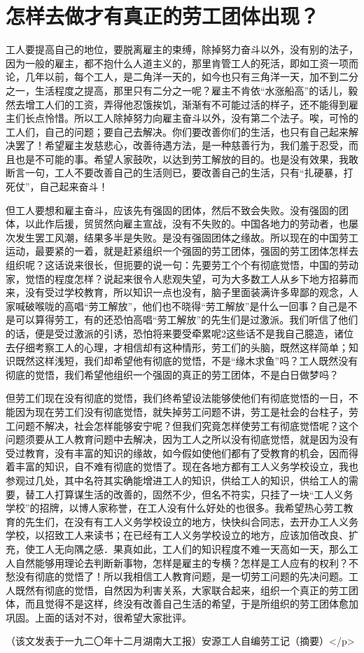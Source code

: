 \section{怎样去做才有真正的劳工团体出现？ }


工人要提高自己的地位，要脱离雇主的束缚，除掉努力奋斗以外，没有别的法子，因为一般的雇主，都不抱什么人道主义的，那里肯管工人的死活，即如工资一项而论，几年以前，每个工人，是二角洋一天的，如今也只有三角洋一天，加不到二分之一，生活程度之提高，那里只有二分之一呢？雇主不肯依“水涨船高”的话儿，毅然去增工人们的工资，弄得他忍饿挨饥，渐渐有不可能过活的样子，还不能得到雇主们长点怜惜。所以工人除掉努力向雇主奋斗以外，没有第二个法子。唉，可怜的工人们，自己的问题；要自己去解决。你们要改善你们的生活，也只有自己起来解决罢了！希望雇主发慈悲心，改善待遇方法，是一种慈善行为，我们羞于忍受，而且也是不可能的事。希望人家鼓吹，以达到劳工解放的目的。也是没有效果，我敢断言一句，工人不要改善自己的生活则已，要改善自己的生活，只有“扎硬暴，打死仗”，自己起来奋斗！

但工人要想和雇主奋斗，应该先有强固的团体，然后不致会失败。没有强固的团体，以此作后援，贸贸然向雇主宣战，没有不失败的。中国各地力的劳动者，也屡次发生罢工风潮，结果多半是失败。是没有强固团体之缘故。所以现在的中国劳工运动，最要紧的一着，就是赶紧组织一个强固的劳工团体，强固的劳工团体怎样去组织呢？这话说来很长，但扼要的说一句：先要劳工个个有彻底觉悟，中国的劳动家，觉悟的程度怎样？说起来很令人悲观失望，可为大多数工人从乡下地方招募而来，没有受过学校教育，所以知识一点也没有，脑子里面装满许多卑鄙的观念，人家喊破喉咙的高唱“劳工解放”，他们也不晓得“劳工解放”是什么一回事？自己是不是可以算得劳工，有的还恐怕高唱“劳工解放”的先生们是过激派。我们听信了他们的话，便是受过激派的引诱，恐怕将来要受牵累呢2这些话不是我自己臆造，诸位去仔细考察工人的心理，才相信却有这种情形，劳工们的头脑，既然这样简单；知识既然这样浅短，我们却希望他有彻底的觉悟，不是“缘木求鱼”吗？工人既然没有彻底的觉悟，我们希望他组织一个强固的真正的劳工团体，不是白日做梦吗？

但劳工们现在没有彻底的觉悟，我们终希望设法能够使他们有彻底觉悟的一日，不能因为现在劳工们没有彻底觉悟，就失掉劳工问题不讲，劳工是社会的台柱子，劳工问题不解决，社会怎样能够安宁呢？但我们究竟怎样使劳工有彻底觉悟呢？这个问题须要从工人教育问题中去解决，因为工人之所以没有彻底觉悟，就是因为没有受过教育，没有丰富的知识的缘故，如今假如使他们都有了受教育的机会，因而得着丰富的知识，自不难有彻底的觉悟了。现在各地方都有工人义务学校设立，我也参观过几处，其中名符其实确能增进工人的知识，供给工人的知识，供给工人的需要，替工人打算谋生活的改善的，固然不少，但名不符实，只挂了一块“工人义务学校”的招牌，以博人家称誉，在工人没有什么好处的也很多。我希望热心劳工教育的先生们，在没有有工人义务学校设立的地方，快快纠合同志，去开办工人义务学校，以招致工人来读书；在已经有工人义务学校设立的地方，应该加倍改良、扩充，使工人无向隅之感．果真如此，工人们的知识程度不难一天高如一天，那么工人自然能够用理论去判断新事物，怎样是雇主的专横？怎样是工人应有的权利？不愁没有彻底的觉悟了！所以我相信工人教育问题，是一切劳工问题的先决问题。工人既然有彻底的觉悟，自然因为利害关系，大家联合起来，组织一个真正的劳工团体，而且觉得不是这样，终没有改善自己生活的希望，于是所组织的劳工团体愈加巩固。上面的话对不对，很希望大家批评。

\begin{flushright}（该文发表于一九二〇年十二月湖南大工报）安源工人自编劳工记（摘要）</p>\end{flushright}

